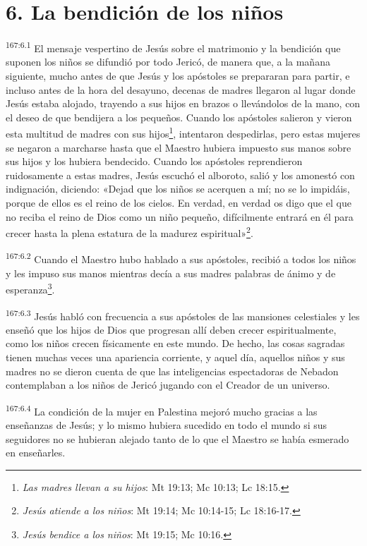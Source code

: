 \section*{6. La bendición de los niños}
\par 
\textsuperscript{167:6.1} El mensaje vespertino de Jesús sobre el matrimonio y la bendición que suponen los niños se difundió por todo Jericó, de manera que, a la mañana siguiente, mucho antes de que Jesús y los apóstoles se prepararan para partir, e incluso antes de la hora del desayuno, decenas de madres llegaron al lugar donde Jesús estaba alojado, trayendo a sus hijos en brazos o llevándolos de la mano, con el deseo de que bendijera a los pequeños. Cuando los apóstoles salieron y vieron esta multitud de madres con sus hijos\footnote{\textit{Las madres llevan a su hijos}: Mt 19:13; Mc 10:13; Lc 18:15.}, intentaron despedirlas, pero estas mujeres se negaron a marcharse hasta que el Maestro hubiera impuesto sus manos sobre sus hijos y los hubiera bendecido. Cuando los apóstoles reprendieron ruidosamente a estas madres, Jesús escuchó el alboroto, salió y los amonestó con indignación, diciendo: «Dejad que los niños se acerquen a mí; no se lo impidáis, porque de ellos es el reino de los cielos. En verdad, en verdad os digo que el que no reciba el reino de Dios como un niño pequeño, difícilmente entrará en él para crecer hasta la plena estatura de la madurez espiritual»\footnote{\textit{Jesús atiende a los niños}: Mt 19:14; Mc 10:14-15; Lc 18:16-17.}.

\par 
\textsuperscript{167:6.2} Cuando el Maestro hubo hablado a sus apóstoles, recibió a todos los niños y les impuso sus manos mientras decía a sus madres palabras de ánimo y de esperanza\footnote{\textit{Jesús bendice a los niños}: Mt 19:15; Mc 10:16.}.

\par 
\textsuperscript{167:6.3} Jesús habló con frecuencia a sus apóstoles de las mansiones celestiales y les enseñó que los hijos de Dios que progresan allí deben crecer espiritualmente, como los niños crecen físicamente en este mundo. De hecho, las cosas sagradas tienen muchas veces una apariencia corriente, y aquel día, aquellos niños y sus madres no se dieron cuenta de que las inteligencias espectadoras de Nebadon contemplaban a los niños de Jericó jugando con el Creador de un universo.

\par 
\textsuperscript{167:6.4} La condición de la mujer en Palestina mejoró mucho gracias a las enseñanzas de Jesús; y lo mismo hubiera sucedido en todo el mundo si sus seguidores no se hubieran alejado tanto de lo que el Maestro se había esmerado en enseñarles.

